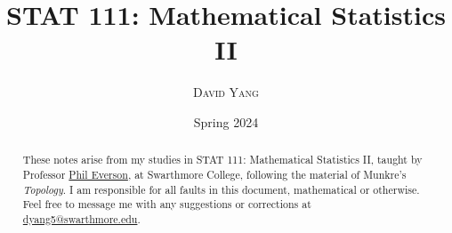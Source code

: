 \documentclass[11pt]{article}
\begin{document}
\title{\LARGE \textbf{STAT 111: Mathematical Statistics II}}
\date{Spring 2024}
\author{\textsc{David Yang}}

\maketitle

\begin{abstract}
These notes arise from my studies in STAT 111: Mathematical Statistics II, taught by 
Professor \href{https://www.swarthmore.edu/NatSci/peverso1/}{Phil Everson}, at Swarthmore College, following the material of Munkre's \textit{Topology}.
I am responsible for all faults in this document, mathematical or otherwise.
Feel free to message me with any suggestions or corrections at \href{mailto:dyang5@swarthmore.edu}{dyang5@swarthmore.edu}.
\end{abstract}

\tableofcontents

\newpage

\end{document}
